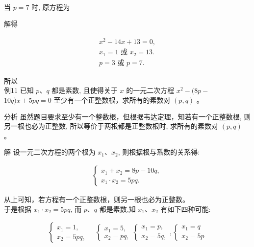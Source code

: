\documentclass[10pt]{article}
\begin{document}
当 $p=7$ 时, 原方程为

解得

\begin{align*}
\begin{gathered}
x^{2}-14 x+13=0, \\
x_{1}=1 \text { 或 } x_{2}=13 . \\
p=3 \text { 或 } p=7 .
\end{gathered}
\end{align*}

所以\\
例11 已知 $p 、 q$ 都是素数, 且使得关于 $x$ 的一元二次方程 $x^{2}-(8 p-$ $10 q) x+5 p q=0$ 至少有一个正整数根，求所有的素数对 $(p, q)$ 。

分析 虽然题目要求至少有一个整数根，但根据韦达定理，知若有一个正整数根, 则另一根也必为正整数, 所以等价于两根都是正整数根时, 求所有的素数对 $(p, q)$ 。

解 设一元二次方程的两个根为 $x_{1} 、 x_{2}$, 则根据根与系数的关系得:

\begin{align*}
\left\{\begin{array}{l}
x_{1}+x_{2}=8 p-10 q, \\
x_{1} \cdot x_{2}=5 p q .
\end{array}\right.
\end{align*}

从上可知，若方程有一个正整数根，则另一根也必为正整数。\\
于是根据 $x_{1} \cdot x_{2}=5 p q$, 而 $p 、 q$ 都是素数,知 $x_{1} 、 x_{2}$ 有如下四种可能:

\begin{align*}
\left\{\begin{array} { l } 
{ x _ { 1 } = 1 , } \\
{ x _ { 2 } = 5 p q , }
\end{array} \quad \left\{\begin{array} { l } 
{ x _ { 1 } = 5 , } \\
{ x _ { 2 } = p q , }
\end{array} \left\{\begin{array}{l}
x_{1}=p, \\
x_{2}=5 q,
\end{array},\left\{\begin{array}{l}
x_{1}=q \\
x_{2}=5 p
\end{array}\right.\right.\right.\right.
\end{align*}
\end{document}
